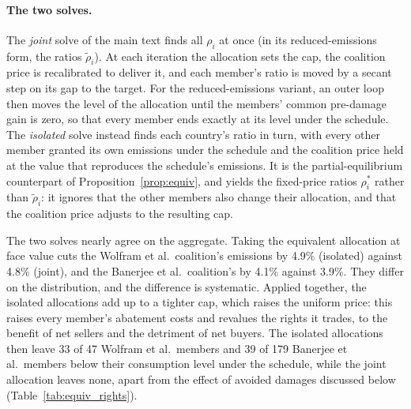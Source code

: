 \documentclass[12pt,english]{article}
\theoremstyle{remark}
\begin{document}
\paragraph{The two solves.} The \emph{joint} solve of the main text finds all $\rho_i$ at once (in its reduced-emissions form, the ratios $\tilde\rho_i$). At each iteration the allocation sets the cap, the coalition price is recalibrated to deliver it, and each member's ratio is moved by a secant step on its gap to the target. For the reduced-emissions variant, an outer loop then moves the level of the allocation until the members' common pre-damage gain is zero, so that every member ends exactly at its level under the schedule. The \emph{isolated} solve instead finds each country's ratio in turn, with every other member granted its own emissions under the schedule and the coalition price held at the value that reproduces the schedule's emissions. It is the partial-equilibrium counterpart of Proposition~\ref{prop:equiv}, and yields the fixed-price ratios $\rho^*_i$ rather than $\tilde\rho_i$: it ignores that the other members also change their allocation, and that the coalition price adjusts to the resulting cap.

The two solves nearly agree on the aggregate. Taking the equivalent allocation at face value cuts the Wolfram et al.\ coalition's emissions by 4.9\% (isolated) against 4.8\% (joint), and the Banerjee et al.\ coalition's by 4.1\% against 3.9\%. They differ on the distribution, and the difference is systematic. %
Applied together, the isolated allocations add up to a tighter cap, which raises the uniform price: this raises every member's abatement costs and revalues the rights it trades, to the benefit of net sellers and the detriment of net buyers. The isolated allocations then leave 33 of 47 Wolfram et al.\ members and 39 of 179 Banerjee et al.\ members below their consumption level under the schedule, while the joint allocation leaves none, apart from the effect of avoided damages discussed below (Table~\ref{tab:equiv_rights}).
\end{document}
